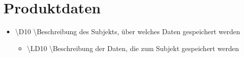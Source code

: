 \section{Produktdaten}

\begin{itemize}
\item \textbackslash D10 \textbackslash Beschreibung des Subjekts, über welches Daten gespeichert werden
\begin{itemize}
\item \textbackslash LD10 \textbackslash Beschreibung der Daten, die zum Subjekt gespeichert werden
\end{itemize}
\end{itemize}